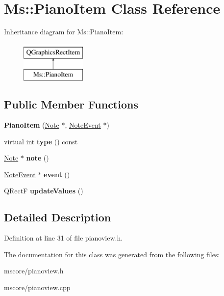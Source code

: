 \hypertarget{class_ms_1_1_piano_item}{}\section{Ms\+:\+:Piano\+Item Class Reference}
\label{class_ms_1_1_piano_item}
Inheritance diagram for Ms\+:\+:Piano\+Item\+:\begin{figure}[H]
\begin{center}
\leavevmode
\includegraphics[height=2.000000cm]{class_ms_1_1_piano_item}
\end{center}
\end{figure}
\subsection*{Public Member Functions}
\begin{DoxyCompactItemize}
\item 
\mbox{\label{class_ms_1_1_piano_item_a19c6d4bcb594ea5051dd6162bec57bd2}} 
{\bfseries Piano\+Item} (\hyperlink{class_ms_1_1_note}{Note} $\ast$, \hyperlink{class_ms_1_1_note_event}{Note\+Event} $\ast$)
\item 
\mbox{\label{class_ms_1_1_piano_item_a2ff91cccbc4d7a52de63e5cb8be1e165}} 
virtual int {\bfseries type} () const
\item 
\mbox{\label{class_ms_1_1_piano_item_afd2ba25020358cffb55619bb4d0f50db}} 
\hyperlink{class_ms_1_1_note}{Note} $\ast$ {\bfseries note} ()
\item 
\mbox{\label{class_ms_1_1_piano_item_a34c13dec36c3a285a9db3e0f0f553747}} 
\hyperlink{class_ms_1_1_note_event}{Note\+Event} $\ast$ {\bfseries event} ()
\item 
\mbox{\label{class_ms_1_1_piano_item_a78832c0fc382ccf6fc0e8388924db688}} 
Q\+RectF {\bfseries update\+Values} ()
\end{DoxyCompactItemize}


\subsection{Detailed Description}


Definition at line 31 of file pianoview.\+h.



The documentation for this class was generated from the following files\+:\begin{DoxyCompactItemize}
\item 
mscore/pianoview.\+h\item 
mscore/pianoview.\+cpp\end{DoxyCompactItemize}
